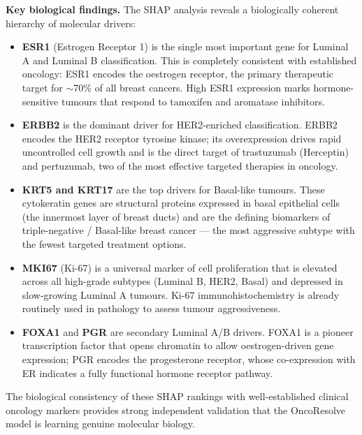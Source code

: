 \documentclass[10pt,a4paper,twocolumn]{article}
\begin{document}
\textbf{Key biological findings.} The SHAP analysis reveals a biologically coherent hierarchy of molecular drivers:
\begin{itemize}
    \item \textbf{ESR1} (Estrogen Receptor 1) is the single most important gene for Luminal A and Luminal B classification. This is completely consistent with established oncology: ESR1 encodes the oestrogen receptor, the primary therapeutic target for $\sim$70\% of all breast cancers. High ESR1 expression marks hormone-sensitive tumours that respond to tamoxifen and aromatase inhibitors.
    \item \textbf{ERBB2} is the dominant driver for HER2-enriched classification. ERBB2 encodes the HER2 receptor tyrosine kinase; its overexpression drives rapid uncontrolled cell growth and is the direct target of trastuzumab (Herceptin) and pertuzumab, two of the most effective targeted therapies in oncology.
    \item \textbf{KRT5 and KRT17} are the top drivers for Basal-like tumours. These cytokeratin genes are structural proteins expressed in basal epithelial cells (the innermost layer of breast ducts) and are the defining biomarkers of triple-negative / Basal-like breast cancer --- the most aggressive subtype with the fewest targeted treatment options.
    \item \textbf{MKI67} (Ki-67) is a universal marker of cell proliferation that is elevated across all high-grade subtypes (Luminal B, HER2, Basal) and depressed in slow-growing Luminal A tumours. Ki-67 immunohistochemistry is already routinely used in pathology to assess tumour aggressiveness.
    \item \textbf{FOXA1} and \textbf{PGR} are secondary Luminal A/B drivers. FOXA1 is a pioneer transcription factor that opens chromatin to allow oestrogen-driven gene expression; PGR encodes the progesterone receptor, whose co-expression with ER indicates a fully functional hormone receptor pathway.
\end{itemize}

The biological consistency of these SHAP rankings with well-established clinical oncology markers provides strong independent validation that the OncoResolve model is learning genuine molecular biology.
\end{document}
